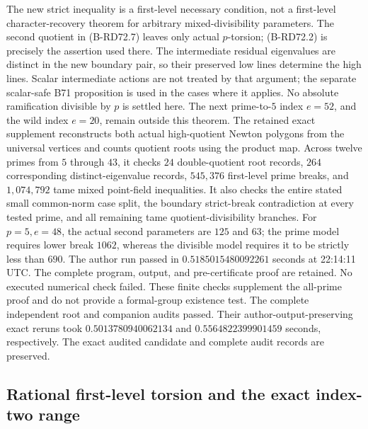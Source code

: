 \begin{remark}
\label{rem:B-RD72-scope}
The new strict inequality is a first-level necessary condition,
not a first-level character-recovery theorem for arbitrary
mixed-divisibility parameters. The second quotient in
(B-RD72.7) leaves only actual \(p\)-torsion; (B-RD72.2) is
precisely the assertion used there.
The intermediate residual eigenvalues are distinct in the new
boundary pair, so their preserved low lines determine the high
lines. Scalar intermediate actions are not treated by that
argument; the separate scalar-safe B71 proposition is used in
the cases where it applies.
No absolute ramification divisible by \(p\) is settled here.
The next prime-to-\(5\) index \(e=52\), and the wild index
\(e=20\), remain outside this theorem.
The retained exact supplement
reconstructs both actual high-quotient Newton polygons from the
universal vertices and counts quotient roots using the product map.
Across twelve primes from \(5\) through \(43\), it checks
\(24\) double-quotient root records, \(264\) corresponding
distinct-eigenvalue records, \(545{,}376\) first-level prime breaks,
and \(1{,}074{,}792\) tame mixed point-field inequalities.
It also checks the entire stated small common-norm case split,
the boundary strict-break contradiction at every tested prime,
and all remaining tame quotient-divisibility branches.
For \(p=5,e=48\), the actual second parameters are \(125\) and
\(63\); the prime model requires lower break \(1062\), whereas
the divisible model requires it to be strictly less than \(690\).
The author run passed in \(0.5185015480092261\) seconds at
22:14:11 UTC. The complete program, output, and pre-certificate
proof are retained. No executed numerical check failed.
These finite checks supplement the all-prime proof and do not
provide a formal-group existence test.
The complete independent root and companion audits passed.
Their author-output-preserving exact reruns took
\(0.5013780940062134\) and \(0.5564822399901459\) seconds,
respectively. The exact audited candidate and complete audit
records are preserved.
\end{remark}


\subsection{Rational first-level torsion and the exact index-two range}

